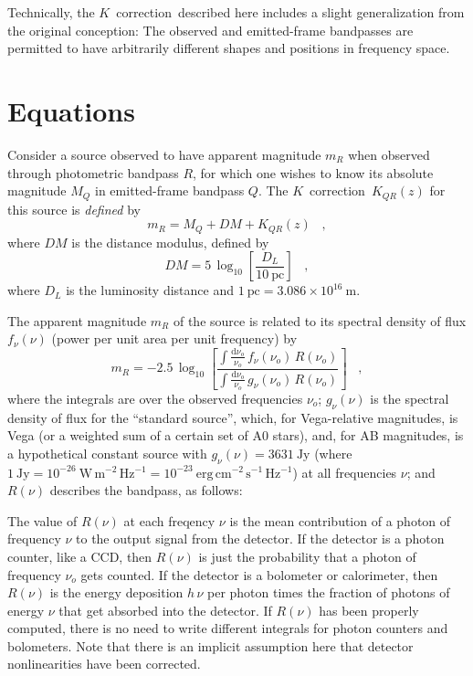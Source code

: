 \documentclass[preprint]{aastex}
\newcommand{\kcorrection}{$K$~correction}
\newcommand{\nuobs}{\nu_o}
\begin{document}
Technically, the \kcorrection\ described here includes a slight
generalization from the original conception: The observed and
emitted-frame bandpasses are permitted to have arbitrarily different
shapes and positions in frequency space.

\section{Equations}

Consider a source observed to have apparent magnitude $m_R$ when
observed through photometric bandpass $R$, for which one wishes to
know its absolute magnitude $M_Q$ in emitted-frame bandpass $Q$.  The
\kcorrection\ $K_{QR}(z)$ for this source is \emph{defined} by
\begin{equation}
\label{eq:definition}
m_R = M_Q + DM + K_{QR}(z) \;\;\;,
\end{equation}
where $DM$ is the distance modulus, defined by
\begin{equation}
DM = 5\,\log_{10}\left[\frac{D_L}{10~\mathrm{pc}}\right] \;\;\;,
\end{equation}
where $D_L$ is the luminosity distance \citep[eg,][]{hogg99cosm} and
$1~\mathrm{pc}= 3.086\times 10^{16}~\mathrm{m}$.

The apparent magnitude $m_R$ of the source is related to its spectral
density of flux $f_{\nu}(\nu)$ (power per unit area per unit
frequency) by
\begin{equation}
m_R = -2.5\,\log_{10}\left[
  \frac{\displaystyle
          \int\frac{\mathrm{d}\nuobs}{\nuobs}\,f_{\nu}(\nuobs)\,R(\nuobs)}
       {\displaystyle
          \int\frac{\mathrm{d}\nuobs}{\nuobs}\,g_{\nu}(\nuobs)\,R(\nuobs)}
\right] \;\;\;,
\end{equation}
where the integrals are over the observed frequencies $\nuobs$;
$g_{\nu}(\nu)$ is the spectral density of flux for the ``standard
source'', which, for Vega-relative magnitudes, is Vega (or a weighted
sum of a certain set of A0 stars), and, for AB magnitudes, is a
hypothetical constant source with $g_{\nu}(\nu)=3631~\mathrm{Jy}$
(where $1~\mathrm{Jy}= 10^{-26}~\mathrm{W\,m^{-2}\,Hz^{-1}}=
10^{-23}~\mathrm{erg\,cm^{-2}\,s^{-1}\,Hz^{-1}}$) at all frequencies
$\nu$; and $R(\nu)$ describes the bandpass, as follows:

The value of $R(\nu)$ at each freqency $\nu$ is the mean contribution
of a photon of frequency $\nu$ to the output signal from the detector.
If the detector is a photon counter, like a CCD, then $R(\nu)$ is just
the probability that a photon of frequency $\nuobs$ gets counted.  If
the detector is a bolometer or calorimeter, then $R(\nu)$ is the
energy deposition $h\,\nu$ per photon times the fraction of photons of
energy $\nu$ that get absorbed into the detector.  If $R(\nu)$ has
been properly computed, there is no need to write different integrals
for photon counters and bolometers.  Note that there is an implicit
assumption here that detector nonlinearities have been corrected.
\end{document}
